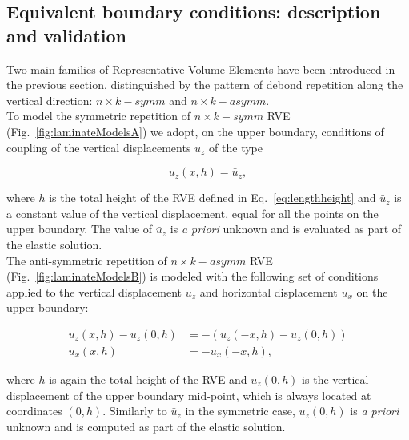 \documentclass[smallextended]{svjour3}       %
\begin{document}
\subsection{Equivalent boundary conditions: description and validation}\label{subsec:bc}

Two main families of Representative Volume Elements have been introduced in the previous section, distinguished by the pattern of debond repetition along the vertical direction: $n\times k-symm$ and $n\times k-asymm$.\\
To model the symmetric repetition of $n\times k-symm$ RVE (Fig.~\ref{fig:laminateModelsA}) we adopt, on the upper boundary, conditions of coupling of the vertical displacements $u_{z}$ of the type

\begin{equation}\label{eq:symmcoupling}
u_{z}\left(x,h\right) = \bar{u}_{z},
\end{equation}

where $h$ is the total height of the RVE defined in Eq.~\ref{eq:lengthheight} and $\bar{u}_{z}$ is a constant value of the vertical displacement, equal for all the points on the upper boundary. The value of $\bar{u}_{z}$ is \emph{a priori} unknown and is evaluated as part of the elastic solution.\\
The anti-symmetric repetition of $n\times k-asymm$ RVE (Fig.~\ref{fig:laminateModelsB}) is modeled with the following set of conditions applied to the vertical displacement $u_{z}$ and horizontal displacement $u_{x}$ on the upper boundary:

\begin{equation}\label{eq:asymmcoupling}
\begin{aligned}
u_{z}\left(x,h\right) - u_{z}\left(0,h\right) &= -\left(u_{z}\left(-x,h\right) - u_{z}\left(0,h\right)\right)\\
u_{x}\left(x,h\right) &= -u_{x}\left(-x,h\right),
\end{aligned}
\end{equation}

where $h$ is again the total height of the RVE and $u_{z}\left(0,h\right)$ is the vertical displacement of the upper boundary mid-point, which is always located at coordinates $(0,h)$. Similarly to $\bar{u}_{z}$ in the symmetric case, $u_{z}\left(0,h\right)$ is \emph{a priori} unknown and is computed as part of the elastic solution.
\end{document}

